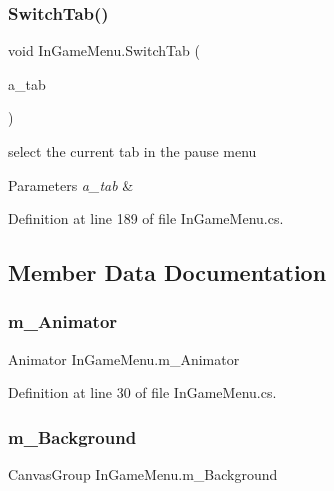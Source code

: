 \subsubsection{\texorpdfstring{Switch\+Tab()}{SwitchTab()}\hspace{0.1cm}{\footnotesize\ttfamily [2/2]}}
{\footnotesize\ttfamily void In\+Game\+Menu.\+Switch\+Tab (\begin{DoxyParamCaption}\item[{Canvas\+Group}]{a\+\_\+tab }\end{DoxyParamCaption})}



select the current tab in the pause menu 


\begin{DoxyParams}{Parameters}
{\em a\+\_\+tab} & \\
\hline
\end{DoxyParams}


Definition at line 189 of file In\+Game\+Menu.\+cs.



\subsection{Member Data Documentation}
\mbox{\label{class_in_game_menu_afcdc52f1c7ade41b9b0d91d9909f541b}} 
\subsubsection{\texorpdfstring{m\+\_\+\+Animator}{m\_Animator}}
{\footnotesize\ttfamily Animator In\+Game\+Menu.\+m\+\_\+\+Animator}



Definition at line 30 of file In\+Game\+Menu.\+cs.

\mbox{\label{class_in_game_menu_ab59b2f57c0fb3c4c50af476a024a4d78}} 
\subsubsection{\texorpdfstring{m\+\_\+\+Background}{m\_Background}}
{\footnotesize\ttfamily Canvas\+Group In\+Game\+Menu.\+m\+\_\+\+Background}



